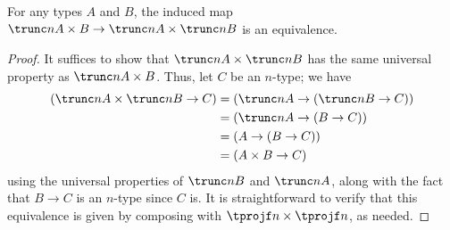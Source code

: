 %
\begin{thm}\label{cor:trunc-prod}
  For any types $A$ and $B$, the induced map $\trunc n{A\times B} \to \trunc nA \times \trunc nB$ is an equivalence.
\end{thm}

\begin{proof}
  It suffices to show that $\trunc nA \times \trunc nB$ has the same universal property as $\trunc n{A\times B}$.
  Thus, let $C$ be an $n$-type; we have
  \begin{align*}
    (\trunc nA \times \trunc nB \to C)
    &= (\trunc nA \to (\trunc nB \to C))\\
    &= (\trunc nA \to (B \to C))\\
    &= (A \to (B \to C))\\
    &= (A \times B \to C)
  \end{align*}
  using the universal properties of $\trunc nB$ and $\trunc nA$, along with the fact that $B\to C$ is an $n$-type since $C$ is.
  It is straightforward to verify that this equivalence is given by composing with $\tprojf n \times \tprojf n$, as needed.
\end{proof}
